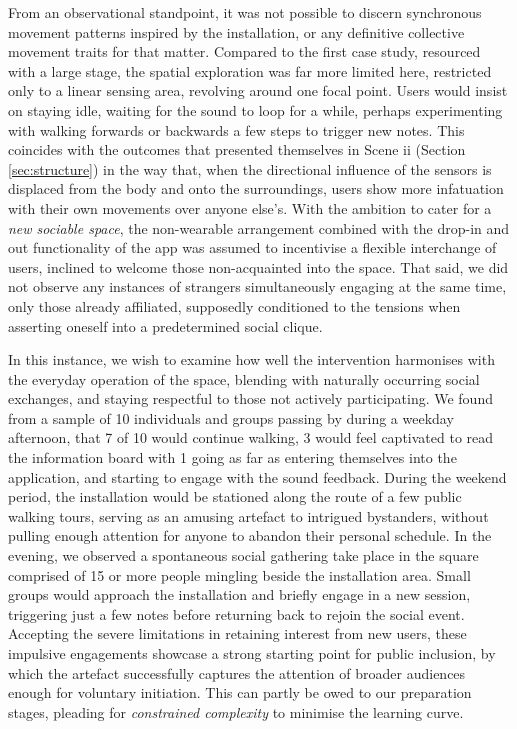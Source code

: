 From an observational standpoint, it was not possible to discern synchronous movement patterns inspired by the installation, or any definitive collective movement traits for that matter. Compared to the first case study, resourced with a large stage, the spatial exploration was far more limited here, restricted only to a linear sensing area, revolving around one focal point. Users would insist on staying idle, waiting for the sound to loop for a while, perhaps experimenting with walking forwards or backwards a few steps to trigger new notes. This coincides with the outcomes that presented themselves in Scene ii (Section \ref{sec:structure}) in the way that, when the directional influence of the sensors is displaced from the body and onto the surroundings, users show more infatuation with their own movements over anyone else's. With the ambition to cater for a \textit{new sociable space}, the non-wearable arrangement combined with the drop-in and out functionality of the app was assumed to incentivise a flexible interchange of users, inclined to welcome those non-acquainted into the space. That said, we did not observe any instances of strangers simultaneously engaging at the same time, only those already affiliated, supposedly conditioned to the tensions when asserting oneself into a predetermined social clique.

In this instance, we wish to examine how well the intervention harmonises with the everyday operation of the space, blending with naturally occurring social exchanges, and staying respectful to those not actively participating. We found from a sample of 10 individuals and groups passing by during a weekday afternoon, that 7 of 10 would continue walking, 3 would feel captivated to read the information board with 1 going as far as entering themselves into the application, and starting to engage with the sound feedback. During the weekend period, the installation would be stationed along the route of a few public walking tours, serving as an amusing artefact to intrigued bystanders, without pulling enough attention for anyone to abandon their personal schedule. In the evening, we observed a spontaneous social gathering take place in the square comprised of 15 or more people mingling beside the installation area. Small groups would approach the installation and briefly engage in a new session, triggering just a few notes before returning back to rejoin the social event. Accepting the severe limitations in retaining interest from new users, these impulsive engagements showcase a strong starting point for public inclusion, by which the artefact successfully captures the attention of broader audiences enough for voluntary initiation. This can partly be owed to our preparation stages, pleading for \textit{constrained complexity} to minimise the learning curve.

